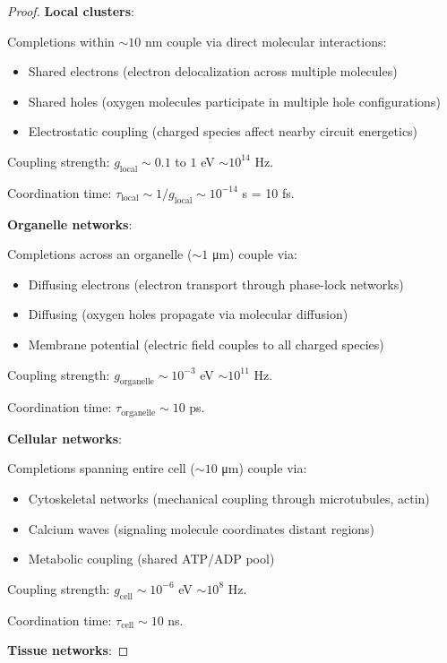\begin{proof}
\textbf{Local clusters}:

Completions within $\sim 10$ nm couple via direct molecular interactions:
\begin{itemize}
\item Shared electrons (electron delocalization across multiple molecules)
\item Shared holes (oxygen molecules participate in multiple hole configurations)
\item Electrostatic coupling (charged species affect nearby circuit energetics)
\end{itemize}

Coupling strength: $g_{\text{local}} \sim 0.1$ to $1$ eV $\sim 10^{14}$ Hz.

Coordination time: $\tau_{\text{local}} \sim 1/g_{\text{local}} \sim 10^{-14}$ s = 10 fs.

\textbf{Organelle networks}:

Completions across an organelle ($\sim 1$ μm) couple via:
\begin{itemize}
\item Diffusing electrons (electron transport through phase-lock networks)
\item Diffusing  (oxygen holes propagate via molecular diffusion)
\item Membrane potential (electric field couples to all charged species)
\end{itemize}

Coupling strength: $g_{\text{organelle}} \sim 10^{-3}$ eV $\sim 10^{11}$ Hz.

Coordination time: $\tau_{\text{organelle}} \sim 10$ ps.

\textbf{Cellular networks}:

Completions spanning entire cell ($\sim 10$ μm) couple via:
\begin{itemize}
\item Cytoskeletal networks (mechanical coupling through microtubules, actin)
\item Calcium waves (signaling molecule coordinates distant regions)
\item Metabolic coupling (shared ATP/ADP pool)
\end{itemize}

Coupling strength: $g_{\text{cell}} \sim 10^{-6}$ eV $\sim 10^{8}$ Hz.

Coordination time: $\tau_{\text{cell}} \sim 10$ ns.

\textbf{Tissue networks}:


\end{proof}
